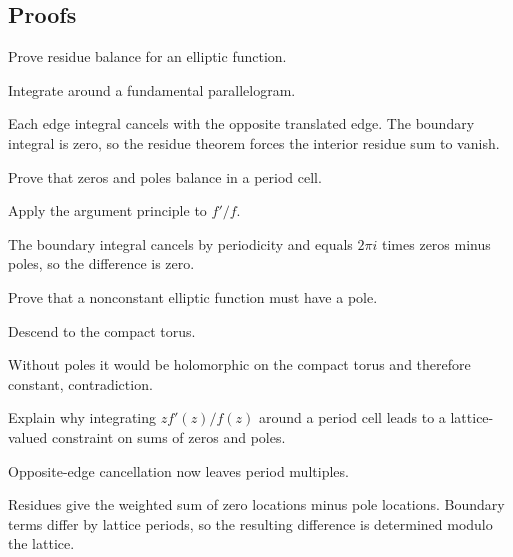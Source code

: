 \subsection*{Proofs}

\begin{exercise}\label{exr:iv28-expand-06}
Prove residue balance for an elliptic function.
\end{exercise}
\begin{hint}
Integrate around a fundamental parallelogram.
\end{hint}
\begin{solution}
Each edge integral cancels with the opposite translated edge. The boundary integral is zero, so the residue theorem forces the interior residue sum to vanish.
\end{solution}

\begin{exercise}\label{exr:iv28-expand-07}
Prove that zeros and poles balance in a period cell.
\end{exercise}
\begin{hint}
Apply the argument principle to \(f'/f\).
\end{hint}
\begin{solution}
The boundary integral cancels by periodicity and equals \(2\pi i\) times zeros minus poles, so the difference is zero.
\end{solution}

\begin{exercise}\label{exr:iv28-expand-08}
Prove that a nonconstant elliptic function must have a pole.
\end{exercise}
\begin{hint}
Descend to the compact torus.
\end{hint}
\begin{solution}
Without poles it would be holomorphic on the compact torus and therefore constant, contradiction.
\end{solution}

\begin{exercise}\label{exr:iv28-expand-09}
Explain why integrating \(z f'(z)/f(z)\) around a period cell leads to a lattice-valued constraint on sums of zeros and poles.
\end{exercise}
\begin{hint}
Opposite-edge cancellation now leaves period multiples.
\end{hint}
\begin{solution}
Residues give the weighted sum of zero locations minus pole locations. Boundary terms differ by lattice periods, so the resulting difference is determined modulo the lattice.
\end{solution}

